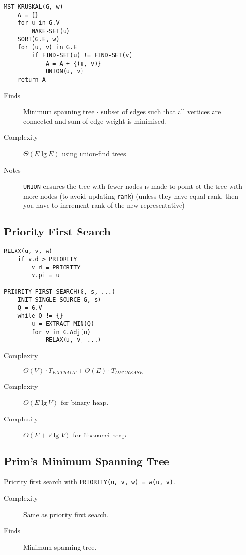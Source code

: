 \documentclass[landscape]{cheat}
\begin{document}
\begin{multicols*}{3}
\begin{lstlisting}
MST-KRUSKAL(G, w)
    A = {}
    for u in G.V
        MAKE-SET(u)
    SORT(G.E, w)
    for (u, v) in G.E
        if FIND-SET(u) != FIND-SET(v)
            A = A + {(u, v)}
            UNION(u, v)
    return A
\end{lstlisting}
\begin{description}
    \item[Finds] Minimum spanning tree - subset of edges such that all vertices are connected and sum of edge weight is minimised.
    \item[Complexity] $\Theta(E\lg{E})$ using union-find trees
    \item[Notes] \texttt{UNION} ensures the tree with fewer nodes is made to point ot the tree with more nodes (to avoid updating \texttt{rank}) (unless they have equal rank, then you have to increment rank of the new representative)
\end{description}

\subsection{Priority First Search}
\begin{lstlisting}
RELAX(u, v, w)
    if v.d > PRIORITY
        v.d = PRIORITY
        v.pi = u

PRIORITY-FIRST-SEARCH(G, s, ...)
    INIT-SINGLE-SOURCE(G, s)
    Q = G.V
    while Q != {}
        u = EXTRACT-MIN(Q)
        for v in G.Adj(u)
            RELAX(u, v, ...)
\end{lstlisting}
\begin{description}
    \item[Complexity] $\Theta(V)\cdot T_{EXTRACT} + \Theta(E)\cdot T_{DECREASE}$
    \item[Complexity] $O(E\lg{V})$ for binary heap.
    \item[Complexity] $O(E + V\lg{V})$ for fibonacci heap.
\end{description}

\subsection{Prim's Minimum Spanning Tree}
Priority first search with \lstinline{PRIORITY(u, v, w) = w(u, v)}.
\begin{description}
    \item[Complexity] Same as priority first search.
    \item[Finds] Minimum spanning tree.
\end{description}


\end{multicols*}
\end{document}
